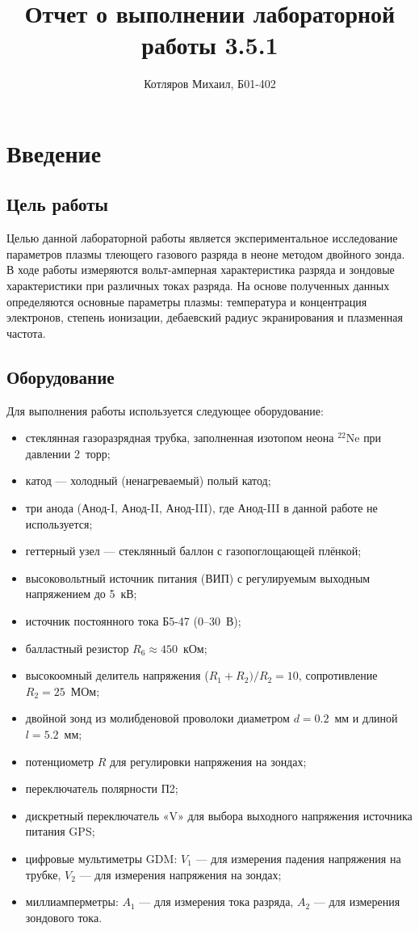 \documentclass[a4paper]{article}
\title{\textbf{Отчет о выполнении лабораторной работы 3.5.1}}
\date{}
\author{Котляров Михаил, Б01-402}
\begin{document}
\maketitle
	
\section{Введение}

\subsection{Цель работы}
Целью данной лабораторной работы является экспериментальное исследование параметров плазмы тлеющего газового разряда в неоне методом двойного зонда. В ходе работы измеряются вольт-амперная характеристика разряда и зондовые характеристики при различных токах разряда. На основе полученных данных определяются основные параметры плазмы: температура и концентрация электронов, степень ионизации, дебаевский радиус экранирования и плазменная частота.

\subsection{Оборудование}
Для выполнения работы используется следующее оборудование:
\begin{itemize}
\item стеклянная газоразрядная трубка, заполненная изотопом неона $^{22}\mathrm{Ne}$ при давлении 2~торр;
    \item катод — холодный (ненагреваемый) полый катод;
    \item три анода (Анод-I, Анод-II, Анод-III), где Анод-III в данной работе не используется;
    \item геттерный узел — стеклянный баллон с газопоглощающей плёнкой;
    \item высоковольтный источник питания (ВИП) с регулируемым выходным напряжением до 5~кВ;
    \item источник постоянного тока Б5-47 (0--30~В);
    \item балластный резистор $R_6 \approx 450$~кОм;
    \item высокоомный делитель напряжения ($R_1 + R_2)/R_2 = 10$, сопротивление $R_2 = 25$~МОм;
    \item двойной зонд из молибденовой проволоки диаметром $d = 0.2$~мм и длиной $l = 5.2$~мм;
    \item потенциометр $R$ для регулировки напряжения на зондах;
    \item переключатель полярности П2;
    \item дискретный переключатель «V» для выбора выходного напряжения источника питания GPS;
    \item цифровые мультиметры GDM: $V_1$ — для измерения падения напряжения на трубке, $V_2$ — для измерения напряжения на зондах;
    \item миллиамперметры: $A_1$ — для измерения тока разряда, $A_2$ — для измерения зондового тока.
\end{itemize}
\end{document}
